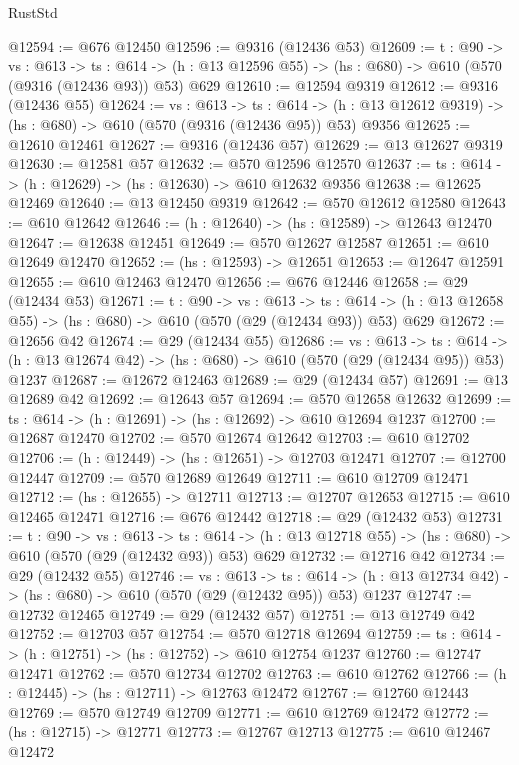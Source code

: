 \begin{lexlean}{RustStd}
\begin{coremodule}
@12594 := @676 @12450
@12596 := @9316 (@12436 @53)
@12609 := {t : @90} ->
  {vs : @613} ->
  {ts : @614} -> (h : @13 @12596 @55) -> (hs : @680) -> @610 (@570 (@9316 (@12436 @93)) @53) @629
@12610 := @12594 @9319
@12612 := @9316 (@12436 @55)
@12624 := {vs : @613} ->
  {ts : @614} -> (h : @13 @12612 @9319) -> (hs : @680) -> @610 (@570 (@9316 (@12436 @95)) @53) @9356
@12625 := @12610 @12461
@12627 := @9316 (@12436 @57)
@12629 := @13 @12627 @9319
@12630 := @12581 @57
@12632 := @570 @12596 @12570
@12637 := {ts : @614} -> (h : @12629) -> (hs : @12630) -> @610 @12632 @9356
@12638 := @12625 @12469
@12640 := @13 @12450 @9319
@12642 := @570 @12612 @12580
@12643 := @610 @12642
@12646 := (h : @12640) -> (hs : @12589) -> @12643 @12470
@12647 := @12638 @12451
@12649 := @570 @12627 @12587
@12651 := @610 @12649 @12470
@12652 := (hs : @12593) -> @12651
@12653 := @12647 @12591
@12655 := @610 @12463 @12470
@12656 := @676 @12446
@12658 := @29 (@12434 @53)
@12671 := {t : @90} ->
  {vs : @613} ->
  {ts : @614} -> (h : @13 @12658 @55) -> (hs : @680) -> @610 (@570 (@29 (@12434 @93)) @53) @629
@12672 := @12656 @42
@12674 := @29 (@12434 @55)
@12686 := {vs : @613} ->
  {ts : @614} -> (h : @13 @12674 @42) -> (hs : @680) -> @610 (@570 (@29 (@12434 @95)) @53) @1237
@12687 := @12672 @12463
@12689 := @29 (@12434 @57)
@12691 := @13 @12689 @42
@12692 := @12643 @57
@12694 := @570 @12658 @12632
@12699 := {ts : @614} -> (h : @12691) -> (hs : @12692) -> @610 @12694 @1237
@12700 := @12687 @12470
@12702 := @570 @12674 @12642
@12703 := @610 @12702
@12706 := (h : @12449) -> (hs : @12651) -> @12703 @12471
@12707 := @12700 @12447
@12709 := @570 @12689 @12649
@12711 := @610 @12709 @12471
@12712 := (hs : @12655) -> @12711
@12713 := @12707 @12653
@12715 := @610 @12465 @12471
@12716 := @676 @12442
@12718 := @29 (@12432 @53)
@12731 := {t : @90} ->
  {vs : @613} ->
  {ts : @614} -> (h : @13 @12718 @55) -> (hs : @680) -> @610 (@570 (@29 (@12432 @93)) @53) @629
@12732 := @12716 @42
@12734 := @29 (@12432 @55)
@12746 := {vs : @613} ->
  {ts : @614} -> (h : @13 @12734 @42) -> (hs : @680) -> @610 (@570 (@29 (@12432 @95)) @53) @1237
@12747 := @12732 @12465
@12749 := @29 (@12432 @57)
@12751 := @13 @12749 @42
@12752 := @12703 @57
@12754 := @570 @12718 @12694
@12759 := {ts : @614} -> (h : @12751) -> (hs : @12752) -> @610 @12754 @1237
@12760 := @12747 @12471
@12762 := @570 @12734 @12702
@12763 := @610 @12762
@12766 := (h : @12445) -> (hs : @12711) -> @12763 @12472
@12767 := @12760 @12443
@12769 := @570 @12749 @12709
@12771 := @610 @12769 @12472
@12772 := (hs : @12715) -> @12771
@12773 := @12767 @12713
@12775 := @610 @12467 @12472

\end{coremodule}
\end{lexlean}
